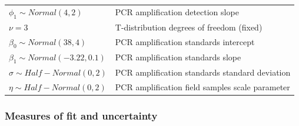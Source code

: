 \documentclass[
]{article}
\begin{document}
\begin{longtable}[]{@{}ll@{}}
\begin{minipage}[t]{0.47\columnwidth}\raggedright
\(\phi_1 \sim Normal(4,2)\)\strut
\end{minipage} & \begin{minipage}[t]{0.47\columnwidth}\raggedright
PCR amplification detection slope\strut
\end{minipage}\tabularnewline
\begin{minipage}[t]{0.47\columnwidth}\raggedright
\(\nu = 3\)\strut
\end{minipage} & \begin{minipage}[t]{0.47\columnwidth}\raggedright
T-distribution degrees of freedom (fixed)\strut
\end{minipage}\tabularnewline
\begin{minipage}[t]{0.47\columnwidth}\raggedright
\(\beta_0 \sim Normal(38,4)\)\strut
\end{minipage} & \begin{minipage}[t]{0.47\columnwidth}\raggedright
PCR amplification standards intercept\strut
\end{minipage}\tabularnewline
\begin{minipage}[t]{0.47\columnwidth}\raggedright
\(\beta_1 \sim Normal(-3.22,0.1)\)\strut
\end{minipage} & \begin{minipage}[t]{0.47\columnwidth}\raggedright
PCR amplification standards slope\strut
\end{minipage}\tabularnewline
\begin{minipage}[t]{0.47\columnwidth}\raggedright
\(\sigma \sim Half-Normal(0,2)\)\strut
\end{minipage} & \begin{minipage}[t]{0.47\columnwidth}\raggedright
PCR amplification standards standard deviation\strut
\end{minipage}\tabularnewline
\begin{minipage}[t]{0.47\columnwidth}\raggedright
\(\eta \sim Half-Normal(0,2)\)\strut
\end{minipage} & \begin{minipage}[t]{0.47\columnwidth}\raggedright
PCR amplification field samples scale parameter\strut
\end{minipage}\tabularnewline
\bottomrule
\end{longtable}

\hypertarget{measures-of-fit-and-uncertainty}{%
\subsubsection{Measures of fit and
uncertainty}\label{measures-of-fit-and-uncertainty}}
\end{document}
